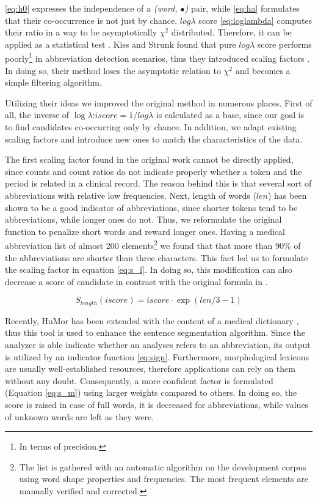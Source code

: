 \eqref{eq:h0} expresses the independence of a \emph{(word, $\bullet$)} pair, while \eqref{eq:ha} formulates that their co-occurrence is not just by chance. $log \lambda$ score  \eqref{eq:loglambda} computes their ratio in a way to be asymptotically $\chi^2$ distributed. 
Therefore, it can be applied as a statistical test \cite{dunning1993accurate}. 
Kiss and Strunk found that pure $log \lambda$ score performs poorly\footnote{In terms of precision.} in abbreviation detection scenarios, thus they introduced scaling factors \cite{kiss2006unsupervised}. 
In doing so, their method loses the asymptotic relation to $\chi^2$ and becomes a simple filtering algorithm.

Utilizing their ideas we improved the original method in numerous places. 
First of all, the inverse of $\log\lambda$:$iscore=1/log\lambda$ is calculated as a base, since our goal is to find candidates co-occurring only by chance. In addition, we adapt existing scaling factors and introduce new ones to match the characteristics of the data.

The first scaling factor found in the original work \cite{kiss2006unsupervised} cannot be directly applied, since counts and count ratios do not indicate properly whether a token and the period is related in a clinical record. The reason behind this is that several sort of abbreviations with relative low frequencies. 
Next, length of words ($len$) has been shown to be a good indicator of abbreviations, since shorter tokens tend to be abbreviations, while longer ones do not. Thus, we reformulate the original function to penalize short words and reward longer ones. 
Having a medical abbreviation list of almost 200 \label{sec:abbrev} elements\footnote{The list is gathered with an automatic algorithm on the development corpus using word shape properties and frequencies. The most frequent elements are manually verified and corrected.} 
we found that that more than 90\% of the abbreviations are shorter than three characters. This fact led us to formulate the scaling factor in equation \eqref{eq:s_l}. 
In doing so, this modification can also decrease a score of candidate in contrast with the original formula in \cite{}.


\begin{equation} \label{eq:s_l}
S_{length}(iscore)= iscore \cdot \exp{(len/3-1)}
\end{equation}

Recently, HuMor \cite{Proszeky1994,Proszeky2005}  has been extended with the content of a medical dictionary \cite{Orosz:mszny2013}, thus this tool is used to enhance the sentence segmentation algorithm.  
Since the analyzer is able indicate whether an analyses refers to an abbreviation, its output is utilized by an indicator function \eqref{eq:sign}.
Furthermore, morphological lexicons are usually well-established resources, therefore applications can rely on them without any doubt. Consequently, a more confident factor is formulated (Equation \eqref{eq:s_m}) using larger weights compared to others. In doing so, the score is raised in case of full words, it is decreased for abbreviations, while values of unknown words are left as they were.

